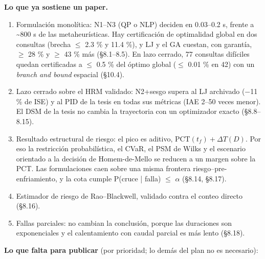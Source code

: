 \documentclass[11pt,a4paper]{article}
\begin{document}
\textbf{Lo que ya sostiene un paper.}

\begin{enumerate}
\item Formulación monolítica: N1–N3 (QP o NLP) deciden en 0.03–0.2 s, frente a \textasciitilde{}800 s de las metaheurísticas. Hay certificación de optimalidad global en dos consultas (brecha $\le$ 2.3 \% y 11.4 \%), y LJ y el GA cuestan, con garantía, $\ge$ 28 \% y $\ge$ 43 \% más (\S{}8.1–8.5). En lazo cerrado, 77 consultas difíciles quedan certificadas a $\le$ 0.5 \% del óptimo global ($\le$ 0.01 \% en 42) con un \emph{branch and bound} espacial (\S{}10.4).
\item Lazo cerrado sobre el HRM validado: N2+sesgo supera al LJ archivado ($-$11 \% de ISE) y al PID de la tesis en todas sus métricas (IAE 2–50 veces menor). El DSM de la tesis no cambia la trayectoria con un optimizador exacto (\S{}8.8–8.15).
\item Resultado estructural de riesgo: el pico es aditivo, $\mathrm{PCT}(t_f)+\Delta T(D)$. Por eso la restricción probabilística, el CVaR, el PSM de Wilks y el escenario orientado a la decisión de Homem-de-Mello se reducen a un margen sobre la PCT. Las formulaciones caen sobre una misma frontera riesgo–pre-enfriamiento, y la cota cumple P(cruce | falla) $\le$ $\alpha$ (\S{}8.14, \S{}8.17).
\item Estimador de riesgo de Rao–Blackwell, validado contra el conteo directo (\S{}8.16).
\item Fallas parciales: no cambian la conclusión, porque las duraciones son exponenciales y el calentamiento con caudal parcial es más lento (\S{}8.18).
\end{enumerate}

\textbf{Lo que falta para publicar} (por prioridad; lo demás del plan no es necesario):
\end{document}
